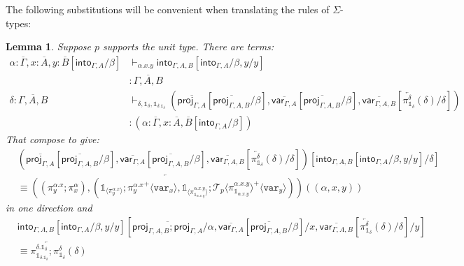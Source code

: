 \documentclass[10pt]{article}
\newtheorem{lemma}{Lemma}
\theoremstyle{definition}
\newcommand{\yields}{\vdash}
\newcommand{\rewrite}[2]{\overleftarrow{#1}(#2)}
\newcommand\ApEl[2]{\mathcal{T}_{#1}\langle#2\rangle}
\newcommand\ApPlus[2]{\ensuremath{{#1}^+ \langle #2 \rangle }}
\newcommand{\upstairs}[1]{\overline{#1}}
\newcommand\proj[1]{\ensuremath{\mathsf{proj}_{#1}}}
\newcommand\qvar[1]{\ensuremath{\mathsf{var}_{#1}}}
\newcommand\into[1]{\ensuremath{\mathsf{into}_{#1}}}
\newcommand\One{\ensuremath{\mathds{1}}}
\newcommand\var[1]{\ensuremath{\mathtt{var}_{#1}}}
\newcommand\ApOne[1]{\ensuremath{\One_{\langle {#1} \rangle }}}
\begin{document}
The following substitutions will be convenient when translating the rules of  $\Sigma$-types:
\begin{lemma}\label{lem:double-into}
Suppose $p$ supports the unit type. There are terms:
\begin{align*}
\alpha : \upstairs{\Gamma}, x : \upstairs{A}, y : \upstairs{B}[\into{\Gamma, A} /\beta] &\yields_{\alpha.x.y} \into{\Gamma, A, B}[\into{\Gamma, A}/\beta, y/y] \\&: \upstairs{\Gamma,A,B} \\
\delta :\upstairs{\Gamma, A, B} &\yields_{\delta, \One_\delta, \One_{\delta.\One_\delta}} (\upstairs{\proj{\Gamma, A}}[\upstairs{\proj{\Gamma, A, B}}/\beta], \upstairs{\qvar{\Gamma, A}}[\upstairs{\proj{\Gamma, A, B}}/\beta], \upstairs{\qvar{\Gamma, A, B}}[\rewrite{\pi^\delta_{\One_\delta}}{\delta}/\delta]) \\&: (\alpha : \upstairs{\Gamma}, x : \upstairs{A},  \upstairs{B}[\into{\Gamma, A}/\beta])
\end{align*}
That compose to give:
\begin{align*}
&(\upstairs{\proj{\Gamma, A}}[\upstairs{\proj{\Gamma, A, B}}/\beta], \upstairs{\qvar{\Gamma, A}}[\upstairs{\proj{\Gamma, A, B}}/\beta], \upstairs{\qvar{\Gamma, A, B}}[\rewrite{\pi^\delta_{\One_\delta}}{\delta}/\delta])[\into{\Gamma, A, B}[\into{\Gamma, A}/\beta, y/y]/\delta] \\
&\equiv \rewrite{((\pi^{\alpha.x}_y;\pi^\alpha_x), (\ApOne{\pi^{\alpha.x}_y};\ApPlus{\pi^{\alpha.x}_y}{\var{x}}, \ApOne{\pi^{\alpha.x.y}_{\One_{\alpha.x.y}}};\ApPlus{\ApEl{p}{\pi^{\alpha.x.y}_{\One_{\alpha.x.y}}}}{\var{y}}))}{(\alpha, x,y)}
\end{align*}
in one direction and
\begin{align*}
&\into{\Gamma, A, B}[\into{\Gamma, A}/\beta, y/y][\upstairs{\proj{\Gamma, A, B};\proj{\Gamma, A}}/\alpha, \upstairs{\qvar{\Gamma, A}}[\upstairs{\proj{\Gamma, A, B}}/\beta]/x, \upstairs{\qvar{\Gamma, A, B}}[\rewrite{\pi^\delta_{\One_\delta}}{\delta}/\delta]/y] \\
&\equiv \rewrite{\pi^{\delta.\One_\delta}_{\One_{\delta.\One_\delta}};\pi^{\delta}_{\One_{\delta}}}{\delta}
\end{align*}
\end{lemma}
\end{document}
